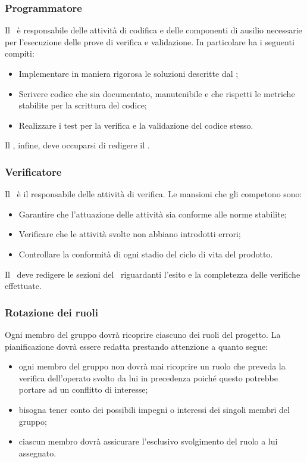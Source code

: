 \documentclass[../NormeProgetto.tex]{subfiles}
\begin{document}
		\subsubsection{Programmatore}
			Il \programmatore\ è responsabile delle attività di codifica e delle componenti di ausilio necessarie per l'esecuzione delle prove di verifica e validazione. In particolare ha i seguenti compiti:
			\begin{itemize}
				\item Implementare in maniera rigorosa le soluzioni descritte dal \progettista;
				\item Scrivere codice che sia documentato, manutenibile e che rispetti le metriche stabilite per la scrittura del codice;
				\item Realizzare i test per la verifica e la validazione del codice stesso.
			\end{itemize}
			Il \programmatore, infine, deve occuparsi di redigere il \manualeutente.
		\subsubsection{Verificatore}
			Il \verificatore\ è il responsabile delle attività di verifica. Le mansioni che gli competono sono:
			\begin{itemize}
				\item Garantire che l'attuazione delle attività sia conforme alle norme stabilite;
				\item Verificare che le attività svolte non abbiano introdotti errori;
				\item Controllare la conformità di ogni stadio del ciclo di vita del prodotto\g.
			\end{itemize}
			Il \verificatore\ deve redigere le sezioni del \pianodiqualifica\ riguardanti l'esito e la completezza delle verifiche effettuate.
		\subsubsection{Rotazione dei ruoli}
			Ogni membro del gruppo dovrà ricoprire ciascuno dei ruoli del progetto. La pianificazione dovrà essere redatta prestando attenzione a quanto segue:
			\begin{itemize}
				\item ogni membro del gruppo non dovrà mai ricoprire un ruolo che preveda la verifica dell'operato svolto da lui in precedenza poiché questo potrebbe portare ad un conflitto di interesse;
				\item bisogna tener conto dei possibili impegni o interessi dei singoli membri del gruppo;
				\item ciascun membro dovrà assicurare l'esclusivo svolgimento del ruolo a lui assegnato.
			\end{itemize}				
\end{document}
